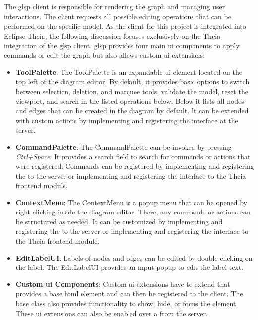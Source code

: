   The \ac{glsp} client is responsible for rendering the graph and managing user interactions. The client requests all possible editing operations that can be performed on the specific model. As the client for this project is integrated into Eclipse Theia, the following discussion focuses exclusively on the Theia integration of the \ac{glsp} client. \cite{glsp-doc} \ac{glsp} provides four main \acs{ui} components to apply commands or edit the graph but also allows custom \ac{ui} extensions: 

  \begin{itemize}
    \item \textbf{ToolPalette}: The ToolPalette is an expandable \ac{ui} element located on the top left of the diagram editor. By default, it provides basic options to switch between selection, deletion, and marquee tools, validate the model, reset the viewport, and search in the listed operations below. Below it lists all nodes and edges that can be created in the diagram by default. It can be extended with custom actions by implementing and registering the  interface at the server. \cite{glsp-doc,glsp-repo} 
    \item \textbf{CommandPalette}: The CommandPalette can be invoked by pressing \textit{Ctrl+Space}. It provides a search field to search for commands or actions that were registered. Commands can be registered by implementing and registering the  to the server or implementing and registering the  interface to the Theia frontend module. \cite{glsp-doc,glsp-repo} 
    \item \textbf{ContextMenu}: The ContextMenu is a popup menu that can be opened by right clicking inside the diagram editor. There, any commands or actions can be structured as needed. It can be customized by implementing and registering the  to the server or implementing and registering the  interface to the Theia frontend module. \cite{glsp-doc,glsp-repo} 
    \item \textbf{EditLabelUI}: Labels of nodes and edges can be edited by double-clicking on the label. The EditLabelUI provides an input popup to edit the label text. \cite{glsp-doc,glsp-repo}
    \item \textbf{Custom \acs{ui} Components}: Custom \acs{ui} extensions have to extend  that provides a base \acs{html} element and can then be registered to the client. The base class also provides functionality to show, hide, or focus the element. These \acs{ui} extensions can also be enabled over a  from the server. \cite{glsp-doc,glsp-repo}
  \end{itemize}

